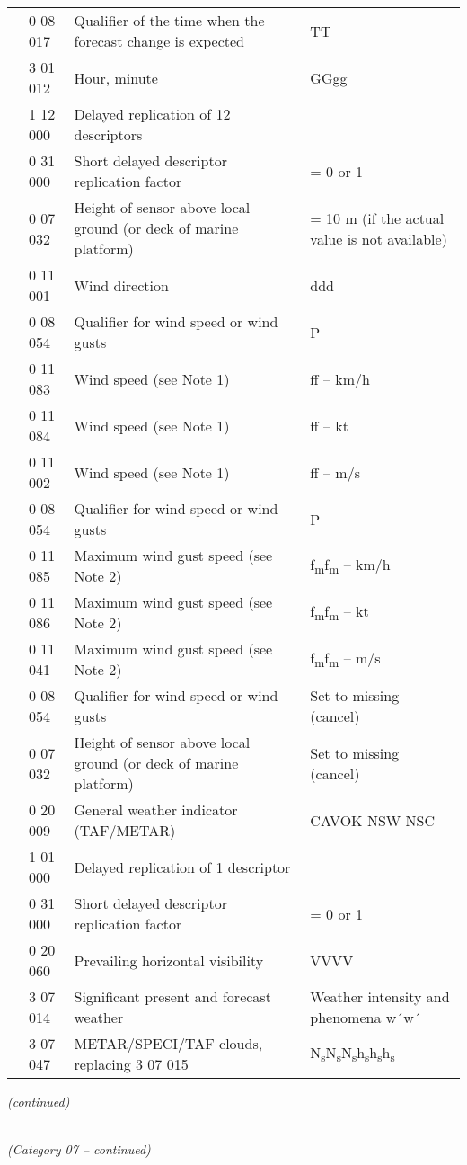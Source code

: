 \begin{longtable}[]{@{}llll@{}}
& 0 08 017 & Qualifier of the time when the forecast change is expected & TT\tabularnewline
& 3 01 012 & Hour, minute & GGgg\tabularnewline
& 1 12 000 & Delayed replication of 12 descriptors &\tabularnewline
& 0 31 000 & Short delayed descriptor replication factor & = 0 or 1\tabularnewline
& 0 07 032 & Height of sensor above local ground (or deck of marine platform) & = 10 m (if the actual value is not available)\tabularnewline
& 0 11 001 & Wind direction & ddd\tabularnewline
& 0 08 054 & Qualifier for wind speed or wind gusts & P\tabularnewline
& 0 11 083 & Wind speed (see Note 1) & ff -- km/h\tabularnewline
& 0 11 084 & Wind speed (see Note 1) & ff -- kt\tabularnewline
& 0 11 002 & Wind speed (see Note 1) & ff -- m/s\tabularnewline
& 0 08 054 & Qualifier for wind speed or wind gusts & P\tabularnewline
& 0 11 085 & Maximum wind gust speed (see Note 2) & f\textsubscript{m}f\textsubscript{m} -- km/h\tabularnewline
& 0 11 086 & Maximum wind gust speed (see Note 2) & f\textsubscript{m}f\textsubscript{m} -- kt\tabularnewline
& 0 11 041 & Maximum wind gust speed (see Note 2) & f\textsubscript{m}f\textsubscript{m} -- m/s\tabularnewline
& 0 08 054 & Qualifier for wind speed or wind gusts & Set to missing (cancel)\tabularnewline
& 0 07 032 & Height of sensor above local ground (or deck of marine platform) & Set to missing (cancel)\tabularnewline
& 0 20 009 & General weather indicator (TAF/METAR) & CAVOK NSW NSC\tabularnewline
& 1 01 000 & Delayed replication of 1 descriptor &\tabularnewline
& 0 31 000 & Short delayed descriptor replication factor & = 0 or 1\tabularnewline
& 0 20 060 & Prevailing horizontal visibility & VVVV\tabularnewline
& 3 07 014 & Significant present and forecast weather & Weather intensity and phenomena w´w´\tabularnewline
& 3 07 047 & METAR/SPECI/TAF clouds, replacing 3 07 015 & N\textsubscript{s}N\textsubscript{s}N\textsubscript{s}h\textsubscript{s}h\textsubscript{s}h\textsubscript{s}\tabularnewline
\bottomrule
\end{longtable}

\emph{(continued)}

\emph{\\
(Category 07 -- continued)}

